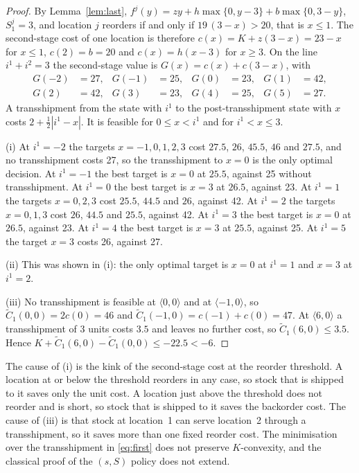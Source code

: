 \documentclass[11pt]{article}
\newcommand{\Ct}{\widetilde{C}}
\theoremstyle{definition}
\begin{document}
\begin{proof}
By Lemma~\ref{lem:last}, $f^j(y)=zy+h\max\{0,y-3\}+b\max\{0,3-y\}$, $S^j_1=3$, and location $j$ reorders if and only if $19\,(3-x)>20$, that is $x\le1$. The second-stage cost of one location is therefore $c(x)=K+z(3-x)=23-x$ for $x\le1$, $c(2)=b=20$ and $c(x)=h(x-3)$ for $x\ge3$. On the line $i^1+i^2=3$ the second-stage value is $G(x)=c(x)+c(3-x)$, with
\begin{align*}
G(-2)&=27, & G(-1)&=25, & G(0)&=23, & G(1)&=42,\\
G(2)&=42, & G(3)&=23, & G(4)&=25, & G(5)&=27 .
\end{align*}
A transshipment from the state with $i^1$ to the post-transshipment state with $x$ costs $2+\tfrac12|i^1-x|$. It is feasible for $0\le x<i^1$ and for $i^1<x\le3$.

(i) At $i^1=-2$ the targets $x=-1,0,1,2,3$ cost $27.5$, $26$, $45.5$, $46$ and $27.5$, and no transshipment costs 27, so the transshipment to $x=0$ is the only optimal decision. At $i^1=-1$ the best target is $x=0$ at $25.5$, against 25 without transshipment. At $i^1=0$ the best target is $x=3$ at $26.5$, against 23. At $i^1=1$ the targets $x=0,2,3$ cost $25.5$, $44.5$ and $26$, against 42. At $i^1=2$ the targets $x=0,1,3$ cost $26$, $44.5$ and $25.5$, against 42. At $i^1=3$ the best target is $x=0$ at $26.5$, against 23. At $i^1=4$ the best target is $x=3$ at $25.5$, against 25. At $i^1=5$ the target $x=3$ costs 26, against 27.

(ii) This was shown in (i): the only optimal target is $x=0$ at $i^1=1$ and $x=3$ at $i^1=2$.

(iii) No transshipment is feasible at $\langle0,0\rangle$ and at $\langle-1,0\rangle$, so $\Ct_1(0,0)=2c(0)=46$ and $\Ct_1(-1,0)=c(-1)+c(0)=47$. At $\langle6,0\rangle$ a transshipment of 3 units costs $3.5$ and leaves no further cost, so $\Ct_1(6,0)\le3.5$. Hence $K+\Ct_1(6,0)-\Ct_1(0,0)\le-22.5<-6$.
\end{proof}

The cause of (i) is the kink of the second-stage cost at the reorder threshold. A location at or below the threshold reorders in any case, so stock that is shipped to it saves only the unit cost. A location just above the threshold does not reorder and is short, so stock that is shipped to it saves the backorder cost. The cause of (iii) is that stock at location~1 can serve location~2 through a transshipment, so it saves more than one fixed reorder cost. The minimisation over the transshipment in \eqref{eq:first} does not preserve $K$-convexity, and the classical proof of the $(s,S)$ policy does not extend.
\end{document}
